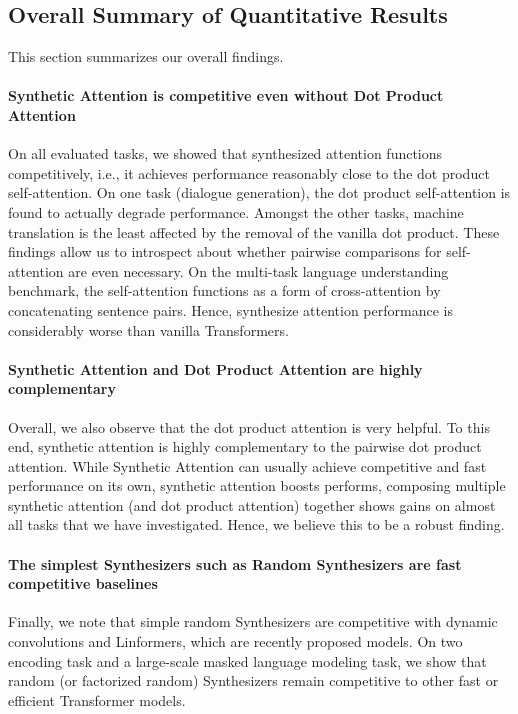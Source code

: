 \documentclass{article}
\begin{document}
\subsection{Overall Summary of Quantitative Results}
This section summarizes our overall findings.
\paragraph{Synthetic Attention is competitive even without Dot Product Attention}
On all evaluated tasks, we showed that synthesized attention functions competitively, i.e., it achieves performance reasonably close to the dot product self-attention. On one task (dialogue generation), the dot product self-attention is found to actually degrade performance. Amongst the other tasks, machine translation is the least affected by the removal of the vanilla dot product. These findings allow us to introspect about whether pairwise comparisons for self-attention are even necessary. On the multi-task language understanding benchmark, the self-attention functions as a form of cross-attention by concatenating sentence pairs. Hence, synthesize attention performance is considerably worse than vanilla Transformers. 
    \paragraph{Synthetic Attention and Dot Product Attention are highly complementary} 
    Overall, we also observe that the dot product attention is very helpful. To this end, synthetic attention is highly complementary to the pairwise dot product attention. While Synthetic Attention can usually achieve competitive and fast performance on its own,  synthetic attention boosts performs, composing multiple synthetic attention (and dot product attention) together shows gains on almost all tasks that we have investigated. Hence, we believe this to be a robust finding. 
    
\paragraph{The simplest Synthesizers such as Random Synthesizers are fast competitive baselines} Finally, we note that simple random Synthesizers are competitive with dynamic convolutions and Linformers, which are recently proposed models. On two encoding task and a large-scale masked language modeling task, we show that random (or factorized random) Synthesizers remain competitive to other fast or efficient Transformer models.
\end{document}
